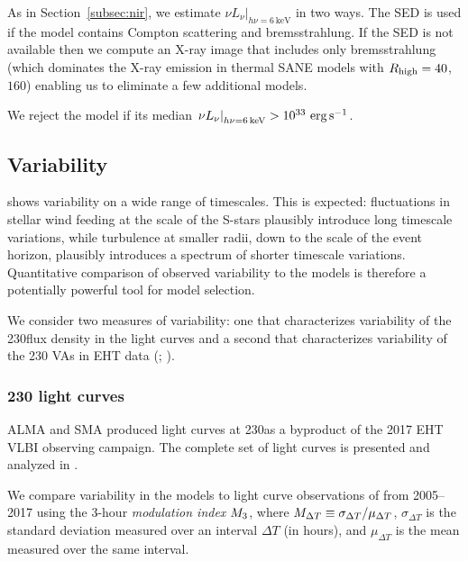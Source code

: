 As in Section~\ref{subsec:nir}, we estimate $\left.\nu L_\nu\right|_{h\nu=6\,\mathrm{keV}}$ in two ways.
The SED is used if the model contains Compton scattering and bremsstrahlung.
If the SED is not available then we compute an X-ray image that includes only bremsstrahlung (which dominates the X-ray emission in thermal SANE models with $R_\mathrm{high} = 40$, $160$) enabling us to eliminate a few additional models.

We reject the model if its median $\left.\nu L_\nu\right|_{h\nu=6\,\mathrm{keV}} > 10^{33}\,\,\mathrm{erg}\,\mathrm{s}^{-1}$.

\subsection{Variability}

\sgra shows variability on a wide range of timescales.
This is expected: fluctuations in stellar wind feeding at the scale of the S-stars plausibly introduce long timescale variations, while turbulence at smaller radii, down to the scale of the event horizon, plausibly introduces a spectrum of shorter timescale variations.
Quantitative comparison of observed variability to the models is therefore a potentially powerful tool for model selection.

We consider two measures of variability: one that characterizes variability of the 230\GHz flux density in the light curves \citep{Wielgus2022} and a second that characterizes variability of the 230 \GHz VAs in EHT data (; \citealt{NoiseModeling}).

\subsubsection{230 \GHz light curves}

ALMA and SMA produced \sgra light curves at 230\GHz as a byproduct of the 2017 EHT VLBI observing campaign.
The complete set of light curves is presented and analyzed in \cite{Wielgus2022}.

We compare variability in the models to light curve observations of \sgra from 2005--2017 using the 3-hour {\em modulation index} $M_{3}$, where $M_{\Delta T} \equiv \sigma_{\Delta T}/\mu_{\Delta T}$, $\sigma_{\Delta T}$ is the standard deviation measured over an interval $\Delta T$ (in hours), and $\mu_{\Delta T}$ is the mean measured over the same interval.

